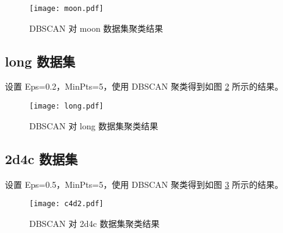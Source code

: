 \documentclass[12pt,AutoFakeBold]{article}
\begin{document}
\begin{figure}[H]
	\centering
    \texttt{[image: moon.pdf]}
    \caption{DBSCAN 对 moon 数据集聚类结果} \label{fig:moon}
\end{figure}

\subsection{long 数据集}

设置 Eps=0.2，MinPts=5，使用 DBSCAN 聚类得到如图 \ref{fig:long} 所示的结果。

\begin{figure}[H]
	\centering
    \texttt{[image: long.pdf]}
    \caption{DBSCAN 对 long 数据集聚类结果} \label{fig:long}
\end{figure}

\subsection{2d4c 数据集}

设置 Eps=0.5，MinPts=5，使用 DBSCAN 聚类得到如图 \ref{fig:2d4c} 所示的结果。

\begin{figure}[H]
	\centering
    \texttt{[image: c4d2.pdf]}
    \caption{DBSCAN 对 2d4c 数据集聚类结果} \label{fig:2d4c}
\end{figure}

\newpage



\end{document}
